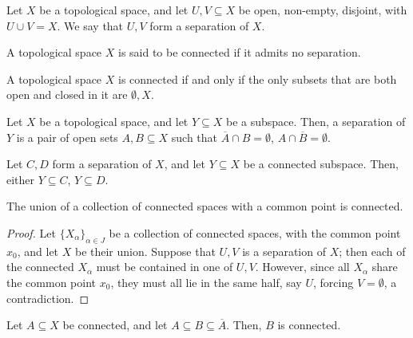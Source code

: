 \documentclass[11pt]{article}
\theoremstyle{definition}
\theoremstyle{remark}
\numberwithin{equation}{section}
\begin{document}
    \begin{definition}
        Let $X$ be a topological space, and let $U, V \subseteq X$ be open,
        non-empty, disjoint, with $U \cup V = X$. We say that $U, V$ form a
        separation of $X$.
    \end{definition}

    \begin{definition}
        A topological space $X$ is said to be connected if it admits no separation.
    \end{definition}

    \begin{lemma}
        A topological space $X$ is connected if and only if the only subsets that are
        both open and closed in it are $\emptyset, X$.
    \end{lemma}

    \begin{lemma}
        Let $X$ be a topological space, and let $Y \subseteq X$ be a subspace. Then,
        a separation of $Y$ is a pair of open sets $A, B \subseteq X$ such that
        $\overline{A} \cap B = \emptyset$, $A \cap \overline{B} = \emptyset$.
    \end{lemma}

    \begin{lemma}
        Let $C, D$ form a separation of $X$, and let $Y \subseteq X$ be a connected
        subspace. Then, either $Y \subseteq C$, $Y \subseteq D$.
    \end{lemma}

    \begin{lemma}
        The union of a collection of connected spaces with a common point is
        connected.
    \end{lemma}
    \begin{proof}
        Let $\{X_\alpha\}_{\alpha \in J}$ be a collection of connected spaces, with
        the common point $x_0$, and let $X$ be their union. Suppose that $U, V$ is a
        separation of $X$; then each of the connected $X_\alpha$ must be contained in
        one of $U, V$. However, since all $X_\alpha$ share the common point $x_0$,
        they must all lie in the same half, say $U$, forcing $V = \emptyset$, a
        contradiction.
    \end{proof}
    

    \begin{lemma}
        Let $A \subseteq X$ be connected, and let $A \subseteq B \subseteq
        \overline{A}$. Then, $B$ is connected.
    \end{lemma}
\end{document}
